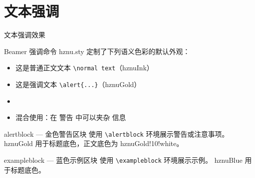 \documentclass[10pt,aspectratio=169]{beamer}
\begin{document}
\section{文本强调}
\begin{frame}{文本强调效果}
  \begin{block}{Beamer 强调命令}
    hznu.sty 定制了下列语义色彩的默认外观：
  \end{block}

  \vspace{.2cm}
  \begin{itemize}
    \item 这是普通正文文本 \texttt{\textbackslash normal text}（hznuInk）
    \item \alert{这是强调文本 \texttt{\textbackslash alert\{...\}}（hznuGold）}
    \item {}
    \item 混合使用：在 \alert{警告} 中可以夹杂  信息
  \end{itemize}

  \vspace{.1cm}
  \begin{alertblock}{alertblock — 金色警告区块}
    使用 \texttt{\textbackslash alertblock} 环境展示警告或注意事项。
    hznuGold 用于标题底色，正文底色为 hznuGold!10!white。
  \end{alertblock}

  \begin{exampleblock}{exampleblock — 蓝色示例区块}
    使用 \texttt{\textbackslash exampleblock} 环境展示示例。
    hznuBlue 用于标题底色。
  \end{exampleblock}
\end{frame}

\end{document}
